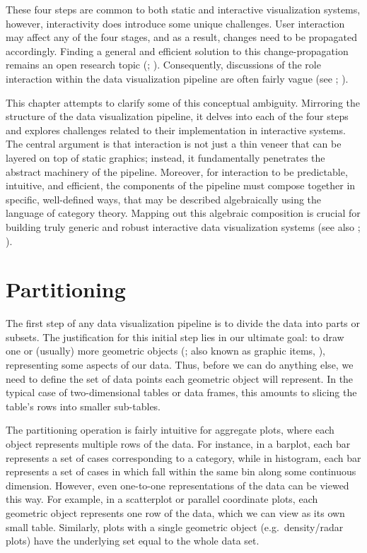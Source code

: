 \documentclass[
]{book}
\theoremstyle{definition}
\theoremstyle{definition}
\theoremstyle{definition}
\theoremstyle{definition}
\theoremstyle{remark}
\begin{document}
These four steps are common to both static and interactive visualization systems, however, interactivity does introduce some unique challenges. User interaction may affect any of the four stages, and as a result, changes need to be propagated accordingly. Finding a general and efficient solution to this change-propagation remains an open research topic (; ). Consequently, discussions of the role interaction within the data visualization pipeline are often fairly vague (see ; ).

This chapter attempts to clarify some of this conceptual ambiguity. Mirroring the structure of the data visualization pipeline, it delves into each of the four steps and explores challenges related to their implementation in interactive systems. The central argument is that interaction is not just a thin veneer that can be layered on top of static graphics; instead, it fundamentally penetrates the abstract machinery of the pipeline. Moreover, for interaction to be predictable, intuitive, and efficient, the components of the pipeline must compose together in specific, well-defined ways, that may be described algebraically using the language of category theory. Mapping out this algebraic composition is crucial for building truly generic and robust interactive data visualization systems (see also ; ).

\section{Partitioning}\label{partitioning}

The first step of any data visualization pipeline is to divide the data into parts or subsets. The justification for this initial step lies in our ultimate goal: to draw one or (usually) more geometric objects (; also known as graphic items, ), representing some aspects of our data. Thus, before we can do anything else, we need to define the set of data points each geometric object will represent. In the typical case of two-dimensional tables or data frames, this amounts to slicing the table's rows into smaller sub-tables.

The partitioning operation is fairly intuitive for aggregate plots, where each object represents multiple rows of the data. For instance, in a barplot, each bar represents a set of cases corresponding to a category, while in histogram, each bar represents a set of cases in which fall within the same bin along some continuous dimension. However, even one-to-one representations of the data can be viewed this way. For example, in a scatterplot or parallel coordinate plots, each geometric object represents one row of the data, which we can view as its own small table. Similarly, plots with a single geometric object (e.g.~density/radar plots) have the underlying set equal to the whole data set.
\end{document}
